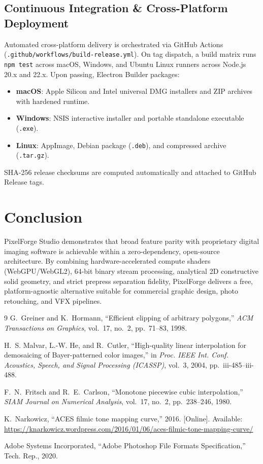 \documentclass[10pt,journal,compsoc]{IEEEtran}
\begin{document}
\subsection{Continuous Integration \& Cross-Platform Deployment}
Automated cross-platform delivery is orchestrated via GitHub Actions (\texttt{.github/workflows/build-release.yml}). On tag dispatch, a build matrix runs \texttt{npm test} across macOS, Windows, and Ubuntu Linux runners across Node.js 20.x and 22.x. Upon passing, Electron Builder packages:
\begin{itemize}
    \item \textbf{macOS}: Apple Silicon and Intel universal DMG installers and ZIP archives with hardened runtime.
    \item \textbf{Windows}: NSIS interactive installer and portable standalone executable (\texttt{.exe}).
    \item \textbf{Linux}: AppImage, Debian package (\texttt{.deb}), and compressed archive (\texttt{.tar.gz}).
\end{itemize}
SHA-256 release checksums are computed automatically and attached to GitHub Release tags.

\section{Conclusion}
PixelForge Studio demonstrates that broad feature parity with proprietary digital imaging software is achievable within a zero-dependency, open-source architecture. By combining hardware-accelerated compute shaders (WebGPU/WebGL2), 64-bit binary stream processing, analytical 2D constructive solid geometry, and strict prepress separation fidelity, PixelForge delivers a free, platform-agnostic alternative suitable for commercial graphic design, photo retouching, and VFX pipelines.

\begin{thebibliography}{9}
G.~Greiner and K.~Hormann, ``Efficient clipping of arbitrary polygons,'' \emph{ACM Transactions on Graphics}, vol.~17, no.~2, pp.~71--83, 1998.

H.~S. Malvar, L.-W. He, and R.~Cutler, ``High-quality linear interpolation for demosaicing of Bayer-patterned color images,'' in \emph{Proc. IEEE Int. Conf. Acoustics, Speech, and Signal Processing (ICASSP)}, vol.~3, 2004, pp.~iii-485--iii-488.

F.~N.~Fritsch and R.~E.~Carlson, ``Monotone piecewise cubic interpolation,'' \emph{SIAM Journal on Numerical Analysis}, vol.~17, no.~2, pp.~238--246, 1980.

K.~Narkowicz, ``ACES filmic tone mapping curve,'' 2016. [Online]. Available: \url{https://knarkowicz.wordpress.com/2016/01/06/aces-filmic-tone-mapping-curve/}

Adobe Systems Incorporated, ``Adobe Photoshop File Formats Specification,'' Tech. Rep., 2020.
\end{thebibliography}
\end{document}
